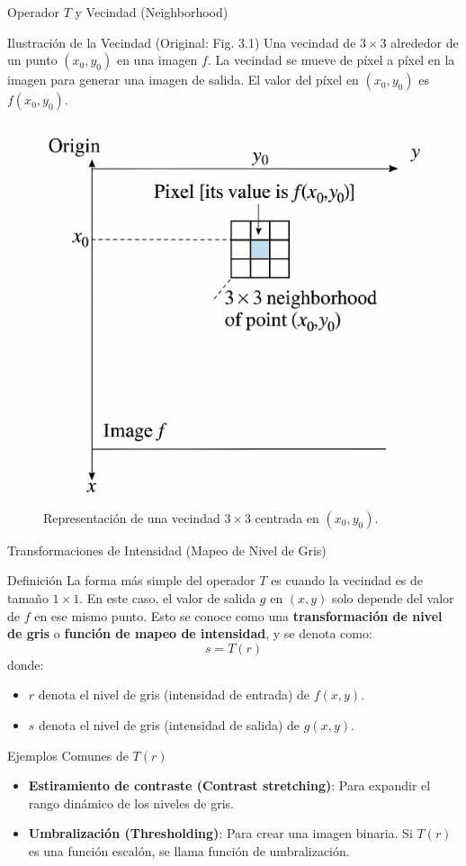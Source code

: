 \documentclass{beamer}
\begin{document}
\begin{frame}{Operador $T$ y Vecindad (Neighborhood)}
    \begin{block}{Ilustración de la Vecindad (Original: Fig. 3.1)}
        Una vecindad de $3 \times 3$ alrededor de un punto $(x_0, y_0)$ en una imagen $f$. La vecindad se mueve de píxel a píxel en la imagen para generar una imagen de salida. El valor del píxel en $(x_0, y_0)$ es $f(x_0, y_0)$.
    \end{block}
    \begin{figure}
        \centering
        \includegraphics[width=0.4\linewidth]{figuras/Fig_3_1.png}
        \caption{Representación de una vecindad $3 \times 3$ centrada en $(x_0, y_0)$.}
    \end{figure}
\end{frame}

\begin{frame}{Transformaciones de Intensidad (Mapeo de Nivel de Gris)}
    \begin{block}{Definición}
    La forma más simple del operador $T$ es cuando la vecindad es de tamaño $1 \times 1$. En este caso, el valor de salida $g$ en $(x,y)$ solo depende del valor de $f$ en ese mismo punto. Esto se conoce como una \textbf{transformación de nivel de gris} o \textbf{función de mapeo de intensidad}, y se denota como:
    \begin{equation}\label{eq:intensity_transform_final}
        s = T(r)
    \end{equation}
    donde:
    \begin{itemize}
        \item $r$ denota el nivel de gris (intensidad de entrada) de $f(x,y)$.
        \item $s$ denota el nivel de gris (intensidad de salida) de $g(x,y)$.
    \end{itemize}
    \end{block}
    \begin{exampleblock}{Ejemplos Comunes de $T(r)$}
        \begin{itemize}
            \item \textbf{Estiramiento de contraste (Contrast stretching)}: Para expandir el rango dinámico de los niveles de gris.
            \item \textbf{Umbralización (Thresholding)}: Para crear una imagen binaria. Si $T(r)$ es una función escalón, se llama función de umbralización.
        \end{itemize}
    \end{exampleblock}
\end{frame}
\end{document}
